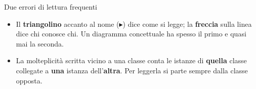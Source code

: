 \begin{attenzione}{Due errori di lettura frequenti}
\begin{itemize}[nosep, leftmargin=*]
  \item Il \textbf{triangolino} accanto al nome ($\blacktriangleright$) dice come si legge; la \textbf{freccia} sulla linea
        dice chi conosce chi. Un diagramma concettuale ha spesso il primo e quasi mai la seconda.
  \item La molteplicità scritta vicino a una classe conta le istanze di \textbf{quella} classe collegate a
        \textbf{una} istanza dell'\textbf{altra}. Per leggerla si parte sempre dalla classe opposta.
\end{itemize}
\end{attenzione}
